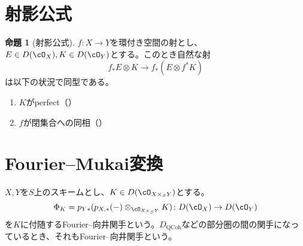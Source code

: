 \documentclass[uplatex, a4paper, dvipdfmx]{jsarticle}
\theoremstyle{definition}
\newtheorem{proposition}[theorem]{命題}
\DeclareMathOperator{\QCoh}{\mathrm{QCoh}}
\begin{document}
\section{射影公式}
\begin{proposition}[射影公式]\label{prop:projection-formula-for-modules}
    $f \colon X \to Y$を環付き空間の射とし、$E \in D(\cO_X), K \in D(\cO_Y)$とする。このとき自然な射
    \begin{equation}
        f_*E \otimes K \to f_*(E \otimes f^*K)
    \end{equation}
    は以下の状況で同型である。
    \begin{enumerate}
        \item $K$がperfect（{\cite[\href{https://stacks.math.columbia.edu/tag/0B54}{Tag 0B54}]{stacks-project}}）
        \item $f$が閉集合への同相（{\cite[\href{https://stacks.math.columbia.edu/tag/0B55}{Tag 0B55}]{stacks-project}}）
    \end{enumerate}
\end{proposition}
\section{Fourier--Mukai変換}
$X, Y$を$S$上のスキームとし、$K \in D(\cO_{X \times_S Y})$とする。
\begin{equation}
    \Phi_K = p_{Y*}(p_{X,*}(-)\otimes_{\cO_{X \times_S Y}} K) \colon D(\cO_X) \to D(\cO_Y)
\end{equation}
を$K$に付随するFourier--向井関手という。$D_{\QCoh}$などの部分圏の間の関手になっているとき、それもFourier--向井関手という。
\end{document}
